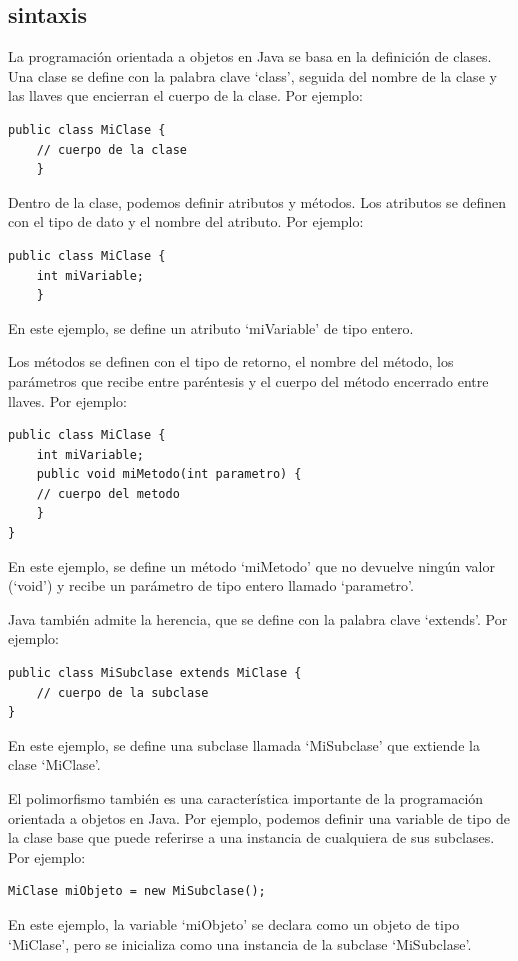 \documentclass[executivepaper]{article}
\begin{document}
\subsection{sintaxis}
La programación orientada a objetos en Java se basa en la definición de clases. Una clase se define con la palabra clave \enquote*{class}, seguida del nombre de la clase y las llaves que encierran el cuerpo de la clase. Por ejemplo:
\begin{lstlisting}
public class MiClase {
    // cuerpo de la clase
    }  
\end{lstlisting}

Dentro de la clase, podemos definir atributos y métodos. Los atributos se definen con el tipo de dato y el nombre del atributo. Por ejemplo:
\begin{lstlisting}
public class MiClase {
    int miVariable;
    }    
\end{lstlisting}
En este ejemplo, se define un atributo \enquote*{miVariable} de tipo entero.

Los métodos se definen con el tipo de retorno, el nombre del método, los parámetros que recibe entre paréntesis y el cuerpo del método encerrado entre llaves. Por ejemplo:
\begin{lstlisting}
public class MiClase {
    int miVariable;
    public void miMetodo(int parametro) {
    // cuerpo del metodo
    }
}
\end{lstlisting}
En este ejemplo, se define un método \enquote*{miMetodo} que no devuelve ningún valor (\enquote*{void}) y recibe un parámetro de tipo entero llamado \enquote*{parametro}.

Java también admite la herencia, que se define con la palabra clave \enquote*{extends}. Por ejemplo:
\begin{lstlisting}
public class MiSubclase extends MiClase {
    // cuerpo de la subclase
}
\end{lstlisting}
En este ejemplo, se define una subclase llamada \enquote*{MiSubclase} que extiende la clase \enquote*{MiClase}.

El polimorfismo también es una característica importante de la programación orientada a objetos en Java. Por ejemplo, podemos definir una variable de tipo de la clase base que puede referirse a una instancia de cualquiera de sus subclases. Por ejemplo:
\begin{lstlisting}
MiClase miObjeto = new MiSubclase();
\end{lstlisting}
En este ejemplo, la variable \enquote*{miObjeto} se declara como un objeto de tipo \enquote*{MiClase}, pero se inicializa como una instancia de la subclase \enquote*{MiSubclase}.
\end{document}
